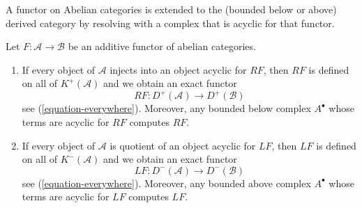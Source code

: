 \begin{proposition}
\label{proposition-enough-acyclics}
\begin{slogan}
A functor on Abelian categories is extended to the (bounded below or above)
derived category by resolving with a complex that is acyclic for that functor.
\end{slogan}
Let $F : \mathcal{A} \to \mathcal{B}$ be an additive functor of
abelian categories.
\begin{enumerate}
\item If every object of $\mathcal{A}$ injects into an object acyclic
for $RF$, then $RF$ is defined on all of $K^{+}(\mathcal{A})$
and we obtain an exact functor
$$
RF : D^{+}(\mathcal{A}) \longrightarrow D^{+}(\mathcal{B})
$$
see (\ref{equation-everywhere}). Moreover, any bounded below complex
$A^\bullet$ whose terms are acyclic for $RF$ computes $RF$.
\item If every object of $\mathcal{A}$ is quotient of
an object acyclic for $LF$, then $LF$ is defined on all of
$K^{-}(\mathcal{A})$ and we obtain an exact functor
$$
LF : D^{-}(\mathcal{A}) \longrightarrow D^{-}(\mathcal{B})
$$
see (\ref{equation-everywhere}). Moreover, any bounded above complex
$A^\bullet$ whose terms are acyclic for $LF$ computes $LF$.
\end{enumerate}
\end{proposition}

